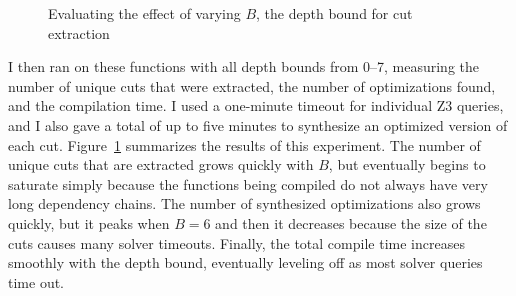 \begin{figure}[tbp]
  \centering
  \hfill
  \hfill
  \caption{Evaluating the effect of varying $B$, the depth bound for
    cut extraction}
  \label{fig:loop}
\end{figure}


I then ran \minotaur{} on these functions with all depth bounds from
0--7, measuring the number of unique cuts that were extracted, the
number of optimizations found, and the compilation time.
%
I used a one-minute timeout for individual Z3 queries, and I also
gave \minotaur{} a total of up to five minutes to synthesize an optimized
version of each cut.
%
Figure~\ref{fig:loop} summarizes the results of this experiment.
%
The number of unique cuts that are extracted grows quickly with $B$,
but eventually begins to saturate simply because the functions being
compiled do not always have very long dependency chains.
%
The number of synthesized optimizations also grows quickly, but it
peaks when $B=6$ and then it decreases because the size of the cuts
causes many solver timeouts.
%
Finally, the total compile time increases smoothly with the depth
bound, eventually leveling off as most solver queries time out.


